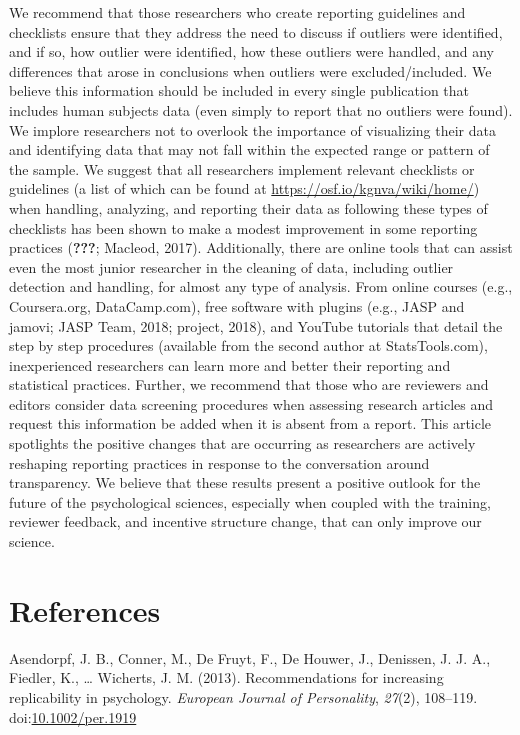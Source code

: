 \documentclass[english,,man]{apa6}
\begin{document}
We recommend that those researchers who create reporting guidelines and checklists ensure that they address the need to discuss if outliers were identified, and if so, how outlier were identified, how these outliers were handled, and any differences that arose in conclusions when outliers were excluded/included. We believe this information should be included in every single publication that includes human subjects data (even simply to report that no outliers were found). We implore researchers not to overlook the importance of visualizing their data and identifying data that may not fall within the expected range or pattern of the sample. We suggest that all researchers implement relevant checklists or guidelines (a list of which can be found at \url{https://osf.io/kgnva/wiki/home/}) when handling, analyzing, and reporting their data as following these types of checklists has been shown to make a modest improvement in some reporting practices ({\textbf{???}}; Macleod, 2017). Additionally, there are online tools that can assist even the most junior researcher in the cleaning of data, including outlier detection and handling, for almost any type of analysis. From online courses (e.g., Coursera.org, DataCamp.com), free software with plugins (e.g., JASP and jamovi; JASP Team, 2018; project, 2018), and YouTube tutorials that detail the step by step procedures (available from the second author at StatsTools.com), inexperienced researchers can learn more and better their reporting and statistical practices. Further, we recommend that those who are reviewers and editors consider data screening procedures when assessing research articles and request this information be added when it is absent from a report. This article spotlights the positive changes that are occurring as researchers are actively reshaping reporting practices in response to the conversation around transparency. We believe that these results present a positive outlook for the future of the psychological sciences, especially when coupled with the training, reviewer feedback, and incentive structure change, that can only improve our science.

\newpage

\hypertarget{references}{%
\section{References}\label{references}}

\setlength{\parindent}{-0.5in}
\setlength{\leftskip}{0.5in}

\hypertarget{refs}{}
\leavevmode\hypertarget{ref-Asendorpf2012}{}%
Asendorpf, J. B., Conner, M., De Fruyt, F., De Houwer, J., Denissen, J. J. A., Fiedler, K., \ldots{} Wicherts, J. M. (2013). Recommendations for increasing replicability in psychology. \emph{European Journal of Personality}, \emph{27}(2), 108--119. doi:\href{https://doi.org/10.1002/per.1919}{10.1002/per.1919}
\end{document}
